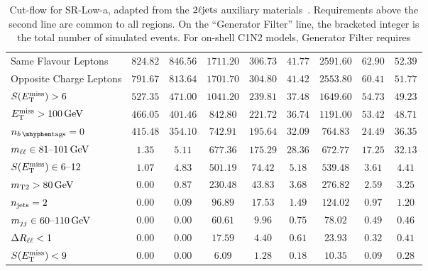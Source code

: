 \begin{sidewaystable}[tp]
{\begin{tabular}{lcccccccc}
Same Flavour Leptons                                       & $824.82$ & $846.56$ & $1711.20$ & $306.73$ & $41.77$ & $2591.60$ & $62.90$ & $52.39$ \\
Opposite Charge Leptons                                   & $791.67$ & $813.64$ & $1701.70$ & $304.80$ & $41.42$ & $2553.80$ & $60.41$ & $51.77$ \\
$\metsig > 6$                                               & $527.35$ & $471.00$ & $1041.20$ & $239.81$ & $37.48$ & $1649.60$ & $54.73$ & $49.23$ \\
$\met > 100\,\eV[G]$                                           & $466.05$ & $401.46$ & $842.80$ & $221.72$ & $36.74$ & $1191.00$ & $53.42$ & $48.71$ \\
\hline
$\nbtag = 0$                                             & $415.48$ & $354.10$ & $742.91$ & $195.64$ & $32.09$ & $764.83$ & $24.49$ & $36.35$ \\
$\mll \in 81\text{--}101\,\eV[G]$                            & $1.35$ & $5.11$ & $677.36$ & $175.29$ & $28.36$ & $672.77$ & $17.25$ & $32.13$ \\
$\metsig \in 6\text{--}12$                                & $1.07$ & $4.83$ & $501.19$ & $74.42$ & $5.18$ & $539.48$ & $3.61$ & $4.41$ \\
$\mttwo > 80\,\eV[G]$                                        & $0.00$ & $0.87$ & $230.48$ & $43.83$ & $3.68$ & $276.82$ & $2.59$ & $3.25$ \\
$\njet = 2$                                  & $0.00$ & $0.09$ & $96.89$ & $17.53$ & $1.49$ & $124.02$ & $0.97$ & $1.20$ \\
$\mjj \in 60\text{--}110\,\eV[G]$                            & $0.00$ & $0.00$ & $60.61$ & $9.96$ & $0.75$ & $78.02$ & $0.49$ & $0.46$ \\
$\rll < 1$                                                & $0.00$ & $0.00$ & $17.59$ & $4.40$ & $0.61$ & $23.93$ & $0.32$ & $0.41$ \\
$\metsig < 9$                                             & $0.00$ & $0.00$ & $6.09$ & $1.28$ & $0.18$ & $10.35$ & $0.09$ & $0.28$ \\
\end{tabular}
}
\caption[
Cut-flow for SR-Low-a
]{%
Cut-flow for SR-Low-a,
adapted from the $\twoljets$ auxiliary materials~\cite{hepdata.116034}.
Requirements above the second line are common to all regions.
On the ``Generator Filter'' line, the bracketed integer is the total number of
simulated events.
For on-shell C1N2 models, Generator Filter requires
}
\end{sidewaystable}
